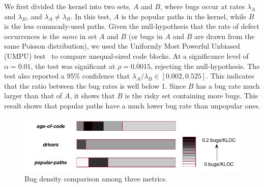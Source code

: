 We first divided the kernel into two sets,
$A$ and $B$, where bugs occur at rates $\lambda_A$ and
$\lambda_B$, and $\lambda_A \neq \lambda_B$. In this test, $A$ is the popular
paths in the kernel, while $B$
is the less commonly-used paths. Given the null-hypothesis
that the rate of defect occurrences is the \textit{same} in set $A$ and $B$
(or bugs in $A$ and $B$ are drawn from the same Poisson distribution),
we used the Uniformly Most Powerful Unbiased (UMPU) test~\cite{shiue1982experiment}
to compare unequal-sized code blocks.
At a significance level of $\alpha=0.01$, the test was significant at
$\rho=0.0015$, rejecting the null-hypothesis.
The test also reported a 95\% confidence that $\lambda_A / \lambda_B
\in [0.002, 0.525]$. This indicates that the ratio between the bug rates is well
below 1. Since $B$ has a bug rate much larger than that of $A$, it shows
that $B$ is the risky set containing more bugs.
%
This result shows that
popular paths have a much lower bug rate than unpopular ones.



\begin{figure}
\centering
\includegraphics[width=1.2\columnwidth]{diagram/bug_density_v2.png}
\caption{\small Bug density comparison among three metrics.}
\label{fig:bug_density}
\end{figure}

